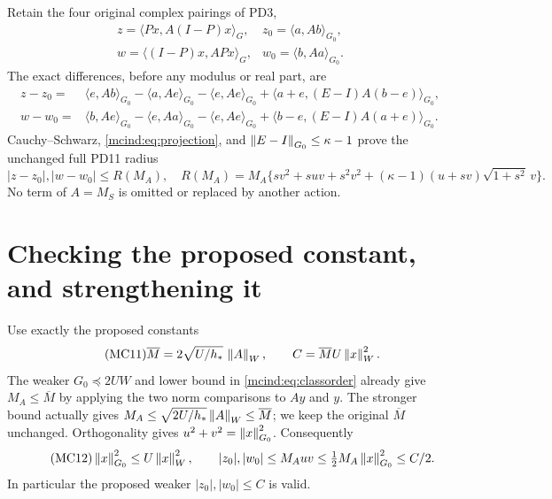 \documentclass[11pt]{article}
\begin{document}
Retain the four original complex pairings of PD3,
\begin{equation}\tag{MC9}\label{mcind:eq:pairings}
 \begin{array}{ll}
 z=\langle Px,A(I-P)x\rangle_G,&z_0=\langle a,Ab\rangle_{G_0},\\
 w=\langle(I-P)x,APx\rangle_G,&w_0=\langle b,Aa\rangle_{G_0}.
 \end{array}
\end{equation}
The exact differences, before any modulus or real part, are
\[
\begin{split}
 z-z_0={}&\langle e,Ab\rangle_{G_0}-\langle a,Ae\rangle_{G_0}
          -\langle e,Ae\rangle_{G_0}
          +\langle a+e,(E-I)A(b-e)\rangle_{G_0},\\
 w-w_0={}&\langle b,Ae\rangle_{G_0}-\langle e,Aa\rangle_{G_0}
          -\langle e,Ae\rangle_{G_0}
          +\langle b-e,(E-I)A(a+e)\rangle_{G_0}.
\end{split}
\]
Cauchy--Schwarz, \eqref{mcind:eq:projection}, and
$\left\lVert E-I\right\rVert_{G_0}\le\kappa-1$ prove the unchanged full PD11
radius
\begin{equation}\tag{MC10}\label{mcind:eq:radius}
 |z-z_0|,|w-w_0|\le R(M_A),\quad
 R(M_A)=M_A\{sv^2+suv+s^2v^2
              +(\kappa-1)(u+sv)\sqrt{1+s^2}\,v\}.
\end{equation}
No term of $A=M_S$ is omitted or replaced by another action.

\section{Checking the proposed constant, and strengthening it}

Use exactly the proposed constants
\begin{equation}\tag{MC11}\label{mcind:eq:C}
 \overline M=2\sqrt{U/h_*}\,\left\lVert A\right\rVert_W,\qquad
 C=\overline M U\left\lVert x\right\rVert_W^2.
\end{equation}
The weaker $G_0\preceq2UW$ and lower bound in
\eqref{mcind:eq:classorder} already give $M_A\le\overline M$ by
applying the two norm comparisons to $Ay$ and $y$.
The stronger bound actually gives
$M_A\le\sqrt{2U/h_*}\left\lVert A\right\rVert_W\le\overline M$; we keep
the original $\overline M$ unchanged. Orthogonality gives
$u^2+v^2=\left\lVert x\right\rVert_{G_0}^2$. Consequently
\begin{equation}\tag{MC12}\label{mcind:eq:center}
 \left\lVert x\right\rVert_{G_0}^2\le U\left\lVert x\right\rVert_W^2,
 \qquad |z_0|,|w_0|\le M_Auv
                \le\tfrac12M_A\left\lVert x\right\rVert_{G_0}^2\le C/2.
\end{equation}
In particular the proposed weaker $|z_0|,|w_0|\le C$ is valid.
\end{document}
